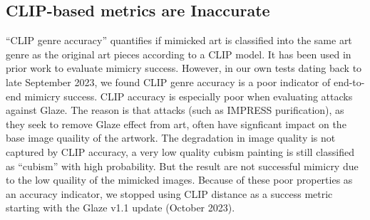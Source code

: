 \subsection{CLIP-based metrics are Inaccurate}

``CLIP genre accuracy'' quantifies if mimicked art is classified into the same art genre as the original 
art pieces according to a CLIP model. It has been used in prior work to evaluate mimicry 
success. However, in our own tests dating back to late September 2023, we
found CLIP genre accuracy is a poor indicator of end-to-end mimicry success.  
CLIP accuracy is especially poor when evaluating attacks against Glaze. The 
reason is that attacks (such as 
IMPRESS purification), as they seek to remove Glaze effect from art, often have signficant impact 
on the base image quaility of the artwork. 
The degradation in image quality is not captured by CLIP accuracy, \eg a very
low quality cubism painting is still classified as ``cubism'' with high
probability. But the result are not successful 
mimicry due to the low quaility of the mimicked images. 
Because of these poor properties as an accuracy indicator, we stopped using
CLIP distance as a success metric starting with the Glaze v1.1 update
(October 2023). 
